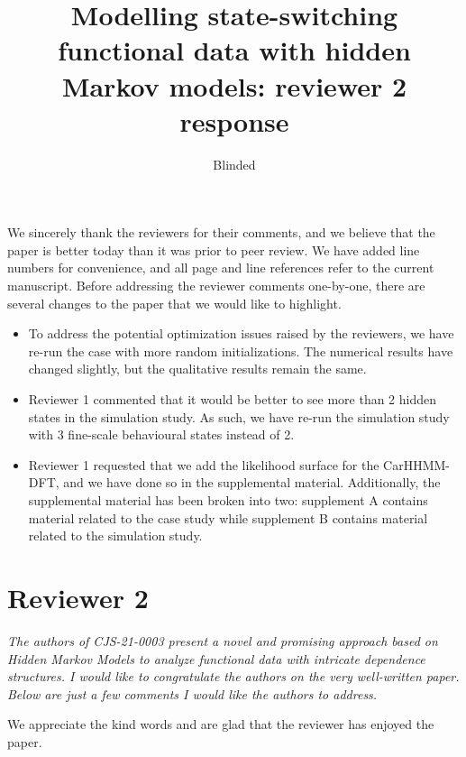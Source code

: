 \documentclass{article}
\begin{document}
\title{Modelling state-switching functional data with hidden Markov models: reviewer 2 response}
\date{}
\author{Blinded}

\maketitle

We sincerely thank the reviewers for their comments, and we believe that the paper is better today than it was prior to peer review. We have added line numbers for convenience, and all page and line references refer to the current manuscript. Before addressing the reviewer comments one-by-one, there are several changes to the paper that we would like to highlight.

\begin{itemize}
    \item To address the potential optimization issues raised by the reviewers, we have re-run the case with more random initializations. The numerical results have changed slightly, but the qualitative results remain the same.
    \item Reviewer 1 commented that it would be better to see more than 2 hidden states in the simulation study. As such, we have re-run the simulation study with 3 fine-scale behavioural states instead of 2.
    \item Reviewer 1 requested that we add the likelihood surface for the CarHHMM-DFT, and we have done so in the supplemental material. Additionally, the supplemental material has been broken into two: supplement A contains material related to the case study while supplement B contains material related to the simulation study. 
\end{itemize}

\section{Reviewer 2}

\textit{The authors of CJS-21-0003 present a novel and promising approach based on Hidden Markov Models to analyze functional data with intricate dependence structures. I would like to congratulate the authors on the very well-written paper. Below are just a few comments I would like the authors to address.}

We appreciate the kind words and are glad that the reviewer has enjoyed the paper.
\end{document}
